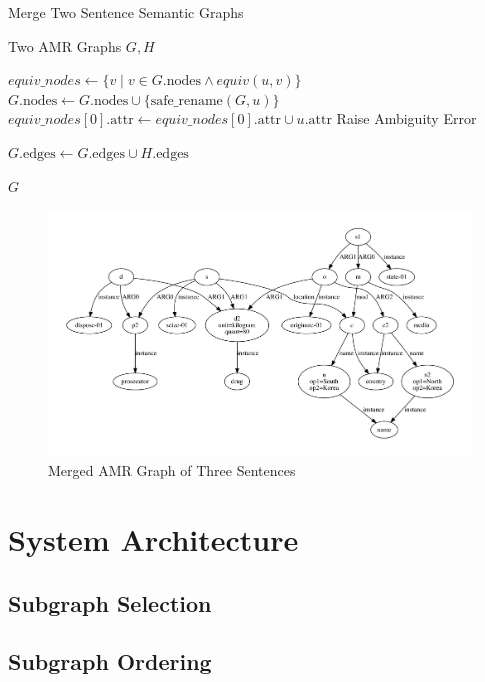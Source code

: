 \documentclass[12pt]{article}
\begin{document}
\begin{algorithm}
\caption{Merge Two Sentence Semantic Graphs}
\label{alg:merge_graphs}
\begin{algorithmic}[1]
\REQUIRE Two AMR Graphs $G, H$

    \STATE $equiv\_nodes \gets \{v \mid v \in G.\text{nodes} \land equiv(u,v)\}$
        \STATE $G.\text{nodes} \gets G.\text{nodes} \cup \{\text{safe\_rename}(G, u)\}$
        \STATE $equiv\_nodes[0].\text{attr} \gets equiv\_nodes[0].\text{attr} \cup u.\text{attr}$
    \ELSE
        \STATE Raise Ambiguity Error
    \ENDIF
\ENDFOR

\STATE $G.\text{edges} \gets G.\text{edges} \cup H.\text{edges}$

\RETURN $G$
\end{algorithmic}
\end{algorithm}

\begin{figure}
\includegraphics[width=\linewidth]{amr_example_3_merged.pdf}
\caption{Merged AMR Graph of Three Sentences}
\label{fig:amr_example_3_merged}
\end{figure}

\section{System Architecture}
\subsection{Subgraph Selection}
\subsection{Subgraph Ordering}
\end{document}

